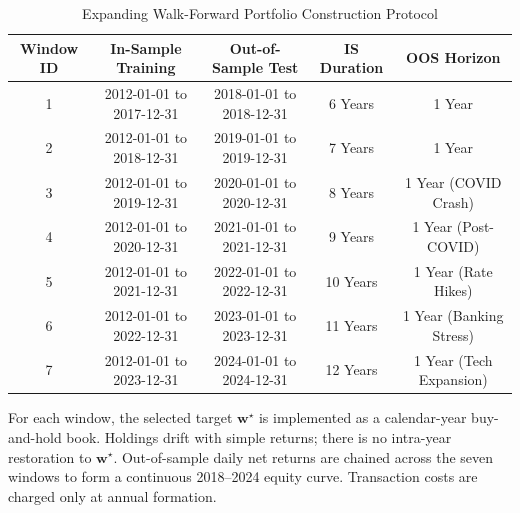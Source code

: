 \documentclass[11pt,a4paper]{article}
\begin{document}
\begin{table}[htbp]
\centering
\caption{Expanding Walk-Forward Portfolio Construction Protocol}
\label{tab:wf_windows}
\hspace*{-1.7cm}
\begin{tabular}{ccccc}
\toprule
\textbf{Window ID} & \textbf{In-Sample Training} & \textbf{Out-of-Sample Test} & \textbf{IS Duration} & \textbf{OOS Horizon} \\
\midrule
1 & 2012-01-01 to 2017-12-31 & 2018-01-01 to 2018-12-31 & 6 Years & 1 Year \\
2 & 2012-01-01 to 2018-12-31 & 2019-01-01 to 2019-12-31 & 7 Years & 1 Year \\
3 & 2012-01-01 to 2019-12-31 & 2020-01-01 to 2020-12-31 & 8 Years & 1 Year (COVID Crash) \\
4 & 2012-01-01 to 2020-12-31 & 2021-01-01 to 2021-12-31 & 9 Years & 1 Year (Post-COVID) \\
5 & 2012-01-01 to 2021-12-31 & 2022-01-01 to 2022-12-31 & 10 Years & 1 Year (Rate Hikes) \\
6 & 2012-01-01 to 2022-12-31 & 2023-01-01 to 2023-12-31 & 11 Years & 1 Year (Banking Stress) \\
7 & 2012-01-01 to 2023-12-31 & 2024-01-01 to 2024-12-31 & 12 Years & 1 Year (Tech Expansion) \\
\bottomrule
\end{tabular}
\end{table}

For each window, the selected target $\mathbf{w}^\star$ is implemented as a calendar-year buy-and-hold book. Holdings drift with simple returns; there is no intra-year restoration to $\mathbf{w}^\star$. Out-of-sample daily net returns are chained across the seven windows to form a continuous 2018--2024 equity curve. Transaction costs are charged only at annual formation.
\end{document}
